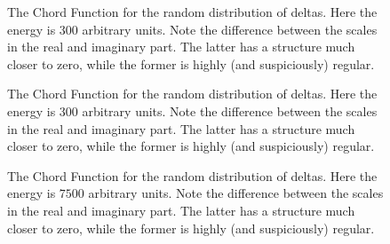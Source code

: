 \documentclass[a4paper,10pt]{article}
\begin{document}
\begin{figure}
\begin{center}
\caption{The Chord Function for the random distribution of deltas. 
Here the energy is $300$ arbitrary units. Note the difference between
the scales in the real and imaginary part. The latter has a structure much
closer to zero, while the former is highly (and suspiciously) regular.}
\label{XiFunction01}
\end{center}
\end{figure}


\begin{figure}
\begin{center}
\caption{The Chord Function for the random distribution of deltas. 
Here the energy is $300$ arbitrary units. Note the difference between
the scales in the real and imaginary part. The latter has a structure much
closer to zero, while the former is highly (and suspiciously) regular.}
\label{XiFunction02}
\end{center}
\end{figure}




\begin{figure}
\begin{center}
\caption{The Chord Function for the random distribution of deltas. 
Here the energy is $7500$ arbitrary units. Note the difference between
the scales in the real and imaginary part. The latter has a structure much
closer to zero, while the former is highly (and suspiciously) regular.}
\label{XiFunction03}
\end{center}
\end{figure}
\end{document}
